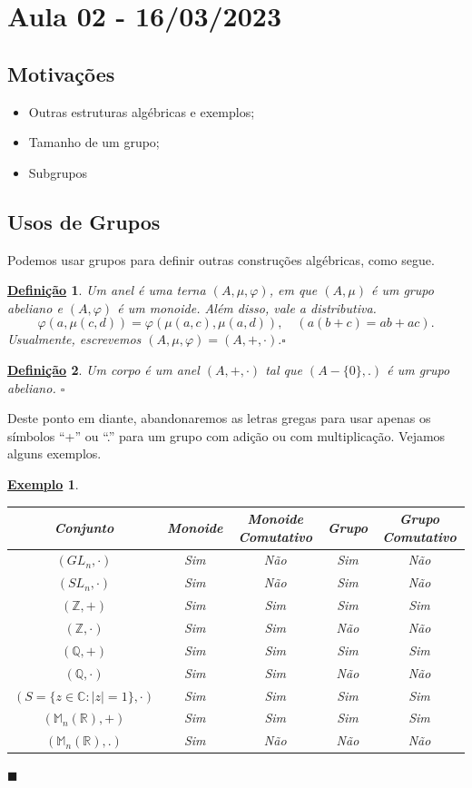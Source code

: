 \documentclass{article}
\newtheorem*{def*}{\underline{Defini\c c\~ao}}
\newtheorem{example*}{\underline{Exemplo}}
\renewcommand\qedsymbol{$\blacksquare$}
\begin{document}
\section{Aula 02 - 16/03/2023}
\subsection{Motiva\c c\~oes}
\begin{itemize}
  \item Outras estruturas alg\'ebricas e exemplos;
  \item Tamanho de um grupo;
  \item Subgrupos
\end{itemize}
\subsection{Usos de Grupos}
  Podemos usar grupos para definir outras constru\c c\~oes alg\'ebricas, como segue.
 \begin{def*}
   Um anel \'e uma terna $(A, \mu, \varphi)$, em que $(A, \mu)$ \'e um grupo abeliano e $(A, \varphi)$ \'e um monoide. Al\'em disso,
vale a distributiva.
   $$
    \varphi(a, \mu(c, d)) = \varphi(\mu(a, c), \mu(a, d)), \quad (a(b + c) = ab + ac).
   $$
   Usualmente, escrevemos $(A, \mu, \varphi) = (A, +, \cdot).\square$
 \end{def*}
\begin{def*}
  Um corpo \'e um anel $(A, +, \cdot)$ tal que $(A-\{0\}, .)$ \'e um grupo abeliano. $\square$
\end{def*}
  Deste ponto em diante, abandonaremos as letras gregas para usar apenas os s\'imbolos ``+'' ou ``.'' para um grupo com adi\c c\~ao
ou com multiplica\c c\~ao. Vejamos alguns exemplos.
\begin{example*}
  \begin{center}
  \begin{tabular}{||c c c c c||}
  \hline
  Conjunto & Monoide & Monoide Comutativo & Grupo & Grupo Comutativo \\ [1ex] 
 \hline\hline
 $(GL_{n}, \cdot)$ & Sim & N\~ao & Sim & N\~ao \\ 
 \hline
 $(SL_{n}, \cdot)$ & Sim & N\~ao & Sim & N\~ao \\
 \hline
 $(\mathbb{Z}, +)$ & Sim & Sim & Sim & Sim \\
 \hline
 $(\mathbb{Z}, \cdot)$ & Sim & Sim & N\~ao & N\~ao \\
 \hline
 $(\mathbb{Q}, +)$ & Sim & Sim & Sim & Sim \\ [1ex] 
 \hline 
 $(\mathbb{Q}, \cdot)$ & Sim & Sim & N\~ao & N\~ao \\ [1ex] 
 \hline 
 $(S = \{z\in \mathbb{C}: |z| = 1\}, \cdot)$ & Sim & Sim & Sim & Sim \\ [1ex] 
 \hline 
 $(\mathbb{M}_{n}(\mathbb{R}), +)$ & Sim & Sim & Sim & Sim \\ [1ex] 
 \hline 
 $(\mathbb{M}_{n}(\mathbb{R}), .)$ & Sim & N\~ao & N\~ao & N\~ao \\ [1ex] 
 \end{tabular}
\qedsymbol
\end{center}
\end{example*}
\end{document}
